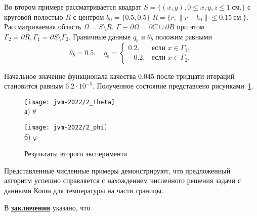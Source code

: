 Во втором примере рассматривается квадрат
$S = \{(x, y), 0 \leq x,y,z \leq 1~\text{см.}\}$ с
круговой полостью $R$ с центром $b_0 =\{0.5, 0.5\}$
$R = \{r, \| r - b_0 \| \leq 0.15~\text{см.} \}$.
Рассматриваемая область $\Omega = S \setminus R$.
$\Gamma \equiv \partial \Omega = \partial C \cup \partial B$ при этом
$ \Gamma_2 = \partial R, \Gamma_1 = \partial S \setminus \Gamma_2$.
Граничные данные $q_b$ и $\theta_b$ положим равными
\[
    \theta_b = 0.5, \quad
    q_b =
    \begin{cases}
        0.2, & \text{если } x \in \Gamma_1, \\
        -0.2, & \text{если } x \in \Gamma_2.
    \end{cases}
\]

Начальное значение функционала качества $0.045$
после тридцати итераций становится равным $6.2\cdot10^{-5}$.
Полученное состояние представлено рисунками~\ref{fig:4_4:6}.

\begin{figure}[h!t]
    \begin{minipage}[b][][b]{0.49\linewidth}
        \centering
        \texttt{[image: jvm-2022/2\_theta]}
        \\ а) $\theta$
    \end{minipage}
    \hfill
    \begin{minipage}[b][][b]{0.49\linewidth}
        \centering
        \texttt{[image: jvm-2022/2\_phi]}
        \\ б) $\varphi$
    \end{minipage}
    \caption{Результаты второго эксперимента}
    \label{fig:4_4:6}
\end{figure}


Представленные численные примеры демонстрируют, что предложенный
алгоритм успешно справляется с нахождением численного решения задачи
с данными Коши для температуры на части границы.

\FloatBarrier
{}                                  %
В \underline{\textbf{заключении}} указано, что


